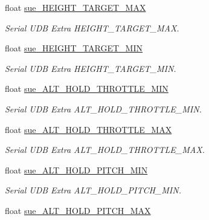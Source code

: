\begin{DoxyCompactItemize}
\item 
float \hyperlink{struct____mavlink__serial__udb__extra__f8__t_a7c84f8d973ed6cb0a7a06c76fac06d49}{sue\+\_\+\+H\+E\+I\+G\+H\+T\+\_\+\+T\+A\+R\+G\+E\+T\+\_\+\+M\+A\+X}
\begin{DoxyCompactList}\small\item\em Serial U\+D\+B Extra H\+E\+I\+G\+H\+T\+\_\+\+T\+A\+R\+G\+E\+T\+\_\+\+M\+A\+X. \end{DoxyCompactList}\item 
float \hyperlink{struct____mavlink__serial__udb__extra__f8__t_a0f6096337b9b8aae98da563b394893ea}{sue\+\_\+\+H\+E\+I\+G\+H\+T\+\_\+\+T\+A\+R\+G\+E\+T\+\_\+\+M\+I\+N}
\begin{DoxyCompactList}\small\item\em Serial U\+D\+B Extra H\+E\+I\+G\+H\+T\+\_\+\+T\+A\+R\+G\+E\+T\+\_\+\+M\+I\+N. \end{DoxyCompactList}\item 
float \hyperlink{struct____mavlink__serial__udb__extra__f8__t_a2ed6d9a956d77dea90b568d8c0a28aaa}{sue\+\_\+\+A\+L\+T\+\_\+\+H\+O\+L\+D\+\_\+\+T\+H\+R\+O\+T\+T\+L\+E\+\_\+\+M\+I\+N}
\begin{DoxyCompactList}\small\item\em Serial U\+D\+B Extra A\+L\+T\+\_\+\+H\+O\+L\+D\+\_\+\+T\+H\+R\+O\+T\+T\+L\+E\+\_\+\+M\+I\+N. \end{DoxyCompactList}\item 
float \hyperlink{struct____mavlink__serial__udb__extra__f8__t_ad16dbe56c561269de2b2d0d9f9af3148}{sue\+\_\+\+A\+L\+T\+\_\+\+H\+O\+L\+D\+\_\+\+T\+H\+R\+O\+T\+T\+L\+E\+\_\+\+M\+A\+X}
\begin{DoxyCompactList}\small\item\em Serial U\+D\+B Extra A\+L\+T\+\_\+\+H\+O\+L\+D\+\_\+\+T\+H\+R\+O\+T\+T\+L\+E\+\_\+\+M\+A\+X. \end{DoxyCompactList}\item 
float \hyperlink{struct____mavlink__serial__udb__extra__f8__t_a49dedb617f81c093b1ef5475979e7b08}{sue\+\_\+\+A\+L\+T\+\_\+\+H\+O\+L\+D\+\_\+\+P\+I\+T\+C\+H\+\_\+\+M\+I\+N}
\begin{DoxyCompactList}\small\item\em Serial U\+D\+B Extra A\+L\+T\+\_\+\+H\+O\+L\+D\+\_\+\+P\+I\+T\+C\+H\+\_\+\+M\+I\+N. \end{DoxyCompactList}\item 
float \hyperlink{struct____mavlink__serial__udb__extra__f8__t_aee1ef82f2a924d7448050ba0b12bacf1}{sue\+\_\+\+A\+L\+T\+\_\+\+H\+O\+L\+D\+\_\+\+P\+I\+T\+C\+H\+\_\+\+M\+A\+X}

\end{DoxyCompactItemize}

